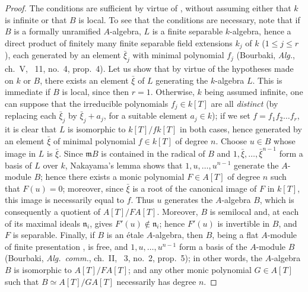 \begin{proof}
The conditions are sufficient by virtue of , without assuming either that $k$ is infinite or that $B$ is local.
To see that the conditions are necessary, note that if $B$ is a formally unramified $A$-algebra, $L$ is a finite separable $k$-algebra, hence a direct product of finitely many finite separable field extensions $k_j$ of $k$ ($1\leq j\leq r$), each generated by an element $\bar{\xi}_j$ with minimal polynomial $f_j$ (Bourbaki, \emph{Alg.}, ch.~V, \textsection~11, no.~4, prop.~4).
Let us show that by virtue of the hypotheses made on $k$ or $B$, there exists an element $\bar{\xi}$ of $L$ generating the $k$-algebra $L$.
This is immediate if $B$ is local, since then $r=1$.
Otherwise, $k$ being assumed infinite, one can suppose that the irreducible polynomials $f_j\in k[T]$ are all \emph{distinct} (by replacing each $\bar{\xi}_j$ by $\bar{\xi}_j+a_j$, for a suitable element $a_j\in k$);
if we set $f=f_1 f_2\ldots f_r$, it is clear that $L$ is isomorphic to $k[T]/f k[T]$ in both cases, hence generated by an element $\bar{\xi}$ of minimal polynomial $f\in k[T]$ of degree $n$.
Choose $u\in B$ whose image in $L$ is $\bar{\xi}$.
Since $\mathfrak{m}B$ is contained in the radical of $B$ and $1,\bar{\xi},\ldots,\bar{\xi}^{n-1}$ form a basis of $L$ over $k$, Nakayama's lemma shows that $1,u,\ldots,u^{n-1}$ generate the $A$-module $B$; hence there exists a monic polynomial $F\in A[T]$ of degree $n$ such that $F(u)=0$;
moreover, since $\bar{\xi}$ is a root of the canonical image of $F$ in $k[T]$, this image is necessarily equal to $f$.
Thus $u$ generates the $A$-algebra $B$, which is consequently a quotient of $A[T]/F A[T]$.
Moreover, $B$ is semilocal and, at each of its maximal ideals $\mathfrak{n}_i$,  gives $F'(u)\notin\mathfrak{n}_i$; hence $F'(u)$ is invertible in $B$, and $F$ is separable.
Finally, if $B$ is an \'etale $A$-algebra, then $B$, being a flat $A$-module of finite presentation , is free, and $1,u,\ldots,u^{n-1}$ form a basis of the $A$-module $B$ (Bourbaki, \emph{Alg.\ comm.}, ch.~II, \textsection~3, no.~2, prop.~5); in other words,
the $A$-algebra $B$ is isomorphic to $A[T]/F A[T]$; and any other monic polynomial $G\in A[T]$ such that $B\simeq A[T]/G A[T]$ necessarily has degree $n$.
\end{proof}

